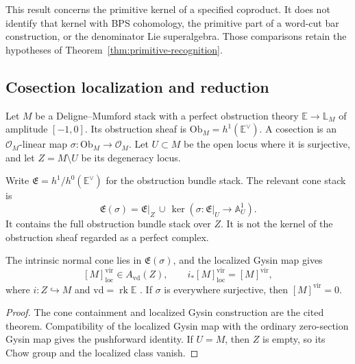 This result concerns the primitive kernel of a specified coproduct.
It does not identify that kernel with BPS cohomology, the primitive
part of a word-cut bar construction, or the denominator Lie
superalgebra. Those comparisons retain the hypotheses of
Theorem~\ref{thm:primitive-recognition}.

\subsection{Cosection localization and reduction}
\label{app:cosection}

\begin{definition}
\label{def:cosection-app-D}
Let $M$ be a Deligne--Mumford stack with a perfect obstruction theory
$\mathbb E\to\mathbb L_M$ of amplitude $[-1,0]$. Its obstruction
sheaf is $\mathrm{Ob}_M=h^1(\mathbb E^\vee)$.
A cosection is an $\mathcal O_M$-linear map
$\sigma:\mathrm{Ob}_M\to\mathcal O_M$.
Let $U\subset M$ be the open locus where it is surjective, and let
$Z=M\setminus U$ be its degeneracy locus.
\end{definition}

Write $\mathfrak E=h^1/h^0(\mathbb E^\vee)$ for the obstruction
bundle stack. The relevant cone stack is
\[
 \mathfrak E(\sigma)=\mathfrak E|_Z\,\cup\,
            \ker(\sigma:\mathfrak E|_U\longrightarrow\mathbb A^1_U).
\]
It contains the full obstruction bundle stack over $Z$. It is not the
kernel of the obstruction sheaf regarded as a perfect complex.

\begin{theorem}
\label{thm:cosection-localisation}
The intrinsic normal cone lies in $\mathfrak E(\sigma)$, and the
localized Gysin map gives
\[
 [M]^{\mathrm{vir}}_{\mathrm{loc}}\in A_{\mathrm{vd}}(Z),
 \qquad i_*[M]^{\mathrm{vir}}_{\mathrm{loc}}=[M]^{\mathrm{vir}},
\]
where $i:Z\hookrightarrow M$ and $\mathrm{vd}=\operatorname{rk}\mathbb E$
\cite[Theorem~5.1]{KiemLi2013}. If $\sigma$ is everywhere
surjective, then $[M]^{\mathrm{vir}}=0$.
\end{theorem}

\begin{proof}
The cone containment and localized Gysin construction are the cited
theorem. Compatibility of the localized Gysin map with the ordinary
zero-section Gysin map gives the pushforward identity. If $U=M$,
then $Z$ is empty, so its Chow group and the localized class vanish.
\end{proof}

